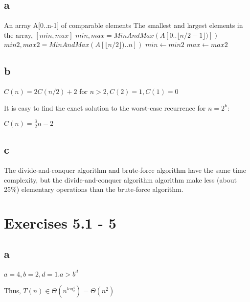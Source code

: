 \documentclass{article}
\begin{document}
\subsection*{a}

\begin{center}
\begin{algorithmic}
\INPUT
An array A[0..n-1] of comparable elements
\OUTPUT
The smallest and largest elements in the array, $[min, max]$
\State \Return {$[A[0], A[0]]$}
\State \Return {$[A[0], A[1]]$}
\State \Return {$[A[1], A[0]]$}
\Else
\State $min,max = MinAndMax(A[0..\lfloor n/2-1 \rfloor)])$
\State $min2,max2 = MinAndMax(A[\lfloor n/2 \rfloor)..n])$
\State $min \leftarrow min2$
\EndIf
{}
\State $max \leftarrow max2$
\EndIf
\State {}
\EndIf
\EndFunction
\end{algorithmic}
\end{center}


\subsection*{b}

$C(n) = 2C(n/2) + 2$ for $n > 2, C(2) = 1, C(1) = 0$

It is easy to find the exact solution to the worst-case recurrence for $n = 2^k$:

$C(n) = \frac{3}{2}n-2$

\subsection*{c}

The divide-and-conquer algorithm and brute-force algorithm have the same time complexity, but the divide-and-conquer algorithm algorithm make less (about 25\%) elementary operations than the brute-force algorithm.

\section{Exercises 5.1 - 5}

\subsection*{a}

$a = 4, b = 2, d = 1. a > b^d$

Thus, $ T(n) \in \Theta(n^{log_2^4}) = \Theta(n^2)$
\end{document}

